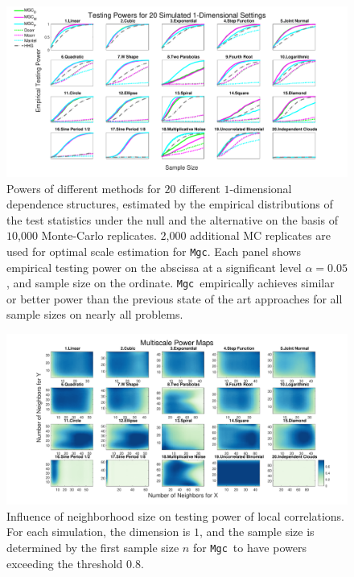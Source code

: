 \documentclass[11pt]{article}
\providecommand{\sct}[1]{{\sc \texttt{#1}}}
\newcommand{\Mgc}{\sct{Mgc}}
\begin{document}
\begin{figure}[htbp]
\includegraphics[width=1.0\textwidth]{../Figures/Fig1DPowerAll}
\caption{
Powers of different methods for $20$ different $1$-dimensional dependence structures, estimated by the empirical distributions of the test statistics under the null and the alternative on the basis of $10$,$000$ Monte-Carlo replicates. $2$,$000$ additional MC replicates are used for optimal scale estimation for \Mgc.
Each panel shows empirical testing power on the abscissa at a significant level $\alpha=0.05$, and sample size on the ordinate.
\Mgc~empirically achieves similar or better power than the previous state of the art approaches for all sample sizes on nearly all problems.}
\label{f:1DAll}
\end{figure}

\begin{figure}[htbp]
\includegraphics[width=1.0\textwidth]{../Figures/Fig1DHeat}
\caption{Influence of neighborhood size on testing power of local correlations. For each simulation, the dimension is $1$, and the sample size is determined by the first sample size $n$ for \Mgc~to have powers exceeding the threshold $0.8$.
}
\label{f:powermaps1}
\end{figure}
\end{document}
